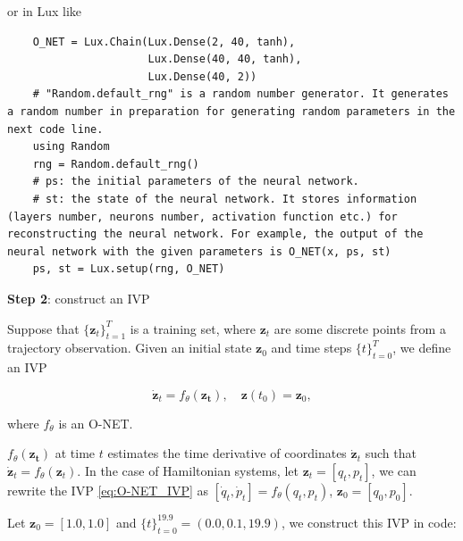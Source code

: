 \documentclass[
	parskip, 			   %
	twoside, 			   %
	DIV=14, 			   %
	BCOR=15.0mm, 		   %
	headsepline, 		   %
	open=right, 		   %
	captions=tableheading, %
	bibliography=totoc,    %
	numbers=noenddot       %
]{scrreprt}
\begin{document}
or in Lux like
\begin{verbatim}
    O_NET = Lux.Chain(Lux.Dense(2, 40, tanh),
                      Lux.Dense(40, 40, tanh),
                      Lux.Dense(40, 2))
    # "Random.default_rng" is a random number generator. It generates a random number in preparation for generating random parameters in the next code line.
    using Random
    rng = Random.default_rng()
    # ps: the initial parameters of the neural network.
    # st: the state of the neural network. It stores information (layers number, neurons number, activation function etc.) for reconstructing the neural network. For example, the output of the neural network with the given parameters is O_NET(x, ps, st)
    ps, st = Lux.setup(rng, O_NET)
\end{verbatim}

\textbf{Step 2}: construct an IVP

Suppose that $\{ \mathbf{z}_{t} \}_{t=1}^{T}$ is a training set, where $\mathbf{z}_{t}$ are some discrete points from a trajectory observation. Given an initial state $\mathbf{z}_{0}$ and time steps $\{ t \}_{t=0}^{T}$, we define an IVP

\begin{equation}
    \label{eq:O-NET_IVP}
    \dot{\mathbf{z}}_t = f_{\theta}(\mathbf{z_t}), \quad \mathbf{z}(t_{0}) = \mathbf{z}_{0},
\end{equation}

where $f_{\theta}$ is an O-NET.

$f_{\theta}(\mathbf{z_t})$ at time $t$ estimates the time derivative of coordinates $\dot{\mathbf{z}}_{t}$ such that $\dot{ \mathbf{z}}_{t} = f_{\theta}(\mathbf{z}_t)$. In the case of Hamiltonian systems, let $\mathbf{z}_{t} = [q_{t}, p_{t}]$, we can rewrite the IVP \ref{eq:O-NET_IVP} as $[\dot q_{t}, \dot p_{t}] = f_{\theta}(q_t, p_t)$, $\mathbf{z}_{0}= [q_{0}, p_{0}]$.

Let $\mathbf{z}_{0}=[1.0, 1.0]$ and $\{ t \}_{t=0}^{19.9} = (0.0, 0.1, 19.9)$, we construct this IVP in code:
\end{document}
